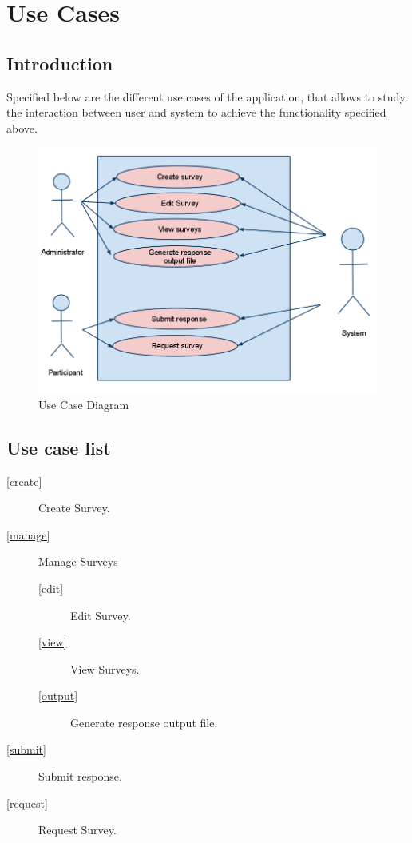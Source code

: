 
\chapter{Use Cases}

\section{Introduction}
Specified below are the different use cases of the application, that allows to study the interaction between user and system to achieve the functionality specified above.

\begin{figure}[h]
  \begin{center}
   \includegraphics[width=13.3cm]{pics/usecase.png}
  \end{center}
 \caption{Use Case Diagram}
\end{figure}

\section{Use case list}
\begin{description}
\item [\ref{create}] Create Survey.
\item [\ref{manage}] Manage Surveys
\begin{description}
\item [\ref{edit}]  Edit Survey.
\item [\ref{view}] View Surveys.
\item [\ref{output}] Generate response output file.
\end{description}
\item [\ref{submit}]Submit response.
\item [\ref{request}]Request Survey.

\end{description}

